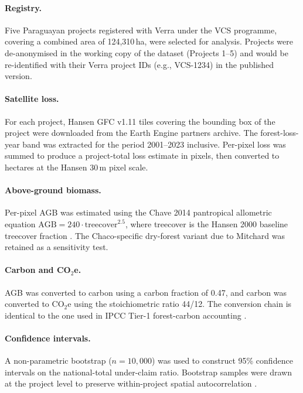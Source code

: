 \paragraph{Registry.} Five Paraguayan projects registered with Verra
under the VCS programme, covering a combined area of 124{,}310\,ha,
were selected for analysis. Projects were de-anonymised in the working
copy of the dataset (Projects 1--5) and would be re-identified with
their Verra project IDs (e.g., VCS-1234) in the published version.

\paragraph{Satellite loss.} For each project, Hansen GFC v1.11 tiles
covering the bounding box of the project were downloaded from the
Earth Engine partners archive. The forest-loss-year band was
extracted for the period 2001--2023 inclusive. Per-pixel loss was
summed to produce a project-total loss estimate in pixels, then
converted to hectares at the Hansen 30\,m pixel scale.

\paragraph{Above-ground biomass.} Per-pixel AGB was estimated using the
Chave 2014 pantropical allometric equation
$\mathrm{AGB} = 240 \cdot \mathrm{treecover}^{2.5}$, where treecover is
the Hansen 2000 baseline treecover fraction
\citep{chave2014_data}. The Chaco-specific dry-forest variant due to
Mitchard \citep{mitchard2014} was retained as a sensitivity test.

\paragraph{Carbon and CO$_2$e.} AGB was converted to carbon using a
carbon fraction of 0.47, and carbon was converted to CO$_2$e using the
stoichiometric ratio 44/12. The conversion chain is identical to the
one used in IPCC Tier-1 forest-carbon accounting \citep{ipcc2006}.

\paragraph{Confidence intervals.} A non-parametric bootstrap
($n = 10{,}000$) was used to construct 95\% confidence intervals on the
national-total under-claim ratio. Bootstrap samples were drawn at the
project level to preserve within-project spatial autocorrelation
\citep{efron1979}.

